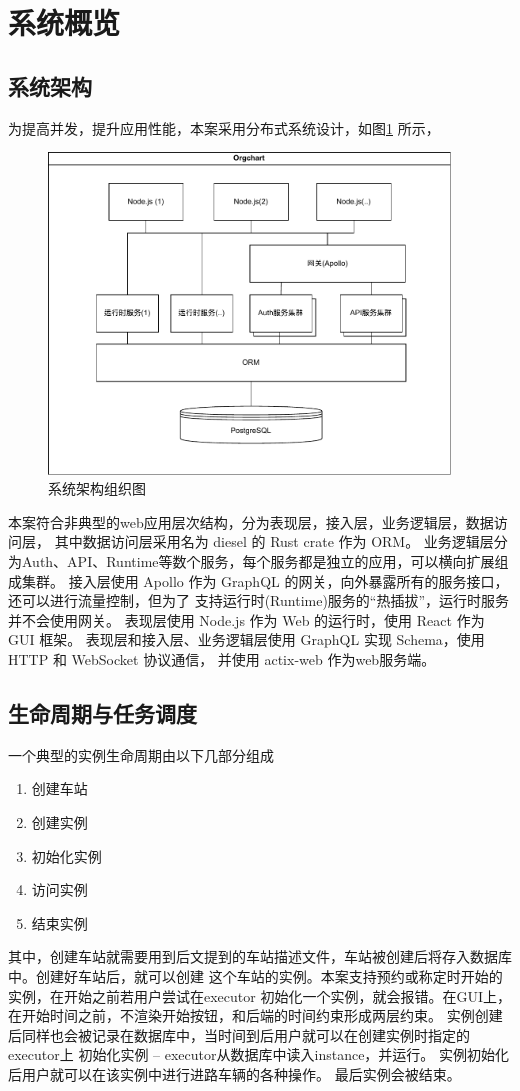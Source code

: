 \section{系统概览}
\subsection{系统架构}
为提高并发，提升应用性能，本案采用分布式系统设计，如图\ref{org} 所示，

\begin{figure}[htbp!]
    \centering
    \includegraphics[width=0.95\textwidth]{figures/pdf/org.pdf}
    \caption{\label{org}系统架构组织图}
\end{figure}

本案符合非典型的web应用层次结构，分为表现层，接入层，业务逻辑层，数据访问层，
其中数据访问层采用名为 diesel 的 Rust crate 作为 ORM。
业务逻辑层分为Auth、API、Runtime等数个服务，每个服务都是独立的应用，可以横向扩展组成集群。
接入层使用 Apollo 作为 GraphQL 的网关，向外暴露所有的服务接口，还可以进行流量控制，但为了
支持运行时(Runtime)服务的“热插拔”，运行时服务并不会使用网关。
表现层使用 Node.js 作为 Web 的运行时，使用 React 作为 GUI 框架。
表现层和接入层、业务逻辑层使用 GraphQL 实现 Schema，使用 HTTP 和 WebSocket 协议通信，
并使用 actix-web 作为web服务端。

\subsection{生命周期与任务调度}
一个典型的实例生命周期由以下几部分组成
\begin{enumerate}
    \item 创建车站
    \item 创建实例
    \item 初始化实例
    \item 访问实例
    \item 结束实例
\end{enumerate}

其中，创建车站就需要用到后文提到的车站描述文件，车站被创建后将存入数据库中。创建好车站后，就可以创建
这个车站的实例。本案支持预约或称定时开始的实例，在开始之前若用户尝试在executor
初始化一个实例，就会报错。在GUI上，在开始时间之前，不渲染开始按钮，和后端的时间约束形成两层约束。
实例创建后同样也会被记录在数据库中，当时间到后用户就可以在创建实例时指定的executor上
初始化实例 -- executor从数据库中读入instance，并运行。
实例初始化后用户就可以在该实例中进行进路车辆的各种操作。
最后实例会被结束。

